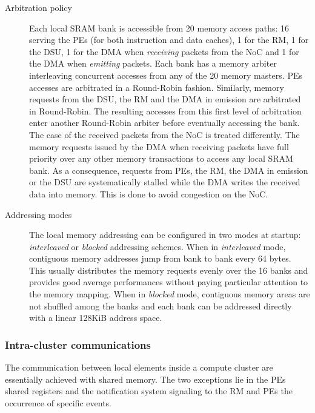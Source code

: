 \documentclass[main.tex]{subfiles}
\begin{document}
\begin{description}
    \item[Arbitration policy]
        Each local SRAM bank is accessible from 20 memory access paths: 16 serving the PEs (for both instruction and data caches), 1 for the RM, 1 for the DSU, 1 for the DMA when \emph{receiving} packets from the NoC and 1 for the DMA when \emph{emitting} packets. Each bank has a memory arbiter interleaving concurrent accesses from any of the 20 memory masters. PEs accesses are arbitrated in a Round-Robin fashion. Similarly, memory requests from the DSU, the RM and the DMA in emission are arbitrated in Round-Robin. The resulting accesses from this first level of arbitration enter another Round-Robin arbiter before eventually accessing the bank. The case of the received packets from the NoC is treated differently. The memory requests issued by the DMA when receiving packets have full priority over any other memory transactions to access any local SRAM bank. As a consequence, requests from PEs, the RM, the DMA in emission or the DSU are systematically stalled while the DMA writes the received data into memory. This is done to avoid congestion on the NoC.

    \item[Addressing modes]
        The local memory addressing can be configured in two modes at startup: \emph{interleaved} or \emph{blocked} addressing schemes. When in \emph{interleaved} mode, contiguous memory addresses jump from bank to bank every 64 bytes. This usually distributes the memory requests evenly over the 16 banks and provides good average performances without paying particular attention to the memory mapping. When in \emph{blocked} mode, contiguous memory areas are not shuffled among the banks and each bank can be addressed directly with a linear 128KiB address space.
\end{description}


\subsubsection{Intra-cluster communications}
\label{sssec_execModel_intraClusterComs}
The communication between local elements inside a compute cluster are essentially achieved with shared memory. The two exceptions lie in the PEs shared registers and the notification system signaling to the RM and PEs the occurrence of specific events.
\end{document}
